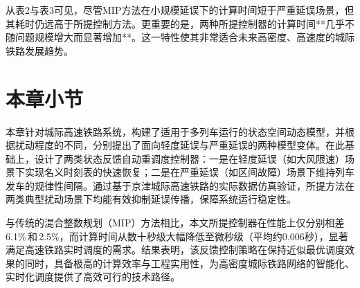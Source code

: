 从表2与表3可见，尽管MIP方法在小规模延误下的计算时间短于严重延误场景，但其耗时仍远高于所提控制方法。更重要的是，两种所提控制器的计算时间**几乎不随问题规模增大而显著增加**。这一特性使其非常适合未来高密度、高速度的城际铁路发展趋势。

\section{本章小节}
本章针对城际高速铁路系统，构建了适用于多列车运行的状态空间动态模型，并根据扰动程度的不同，分别提出了面向轻度延误与严重延误的两种模型变体。在此基础上，设计了两类状态反馈自动重调度控制器：一是在轻度延误（如大风限速）场景下实现名义时刻表的快速恢复；二是在严重延误（如区间故障）场景下维持列车发车的规律性间隔。通过基于京津城际高速铁路的实际数据仿真验证，所提方法在两类典型扰动场景下均能有效抑制延误传播，保障系统运行稳定性。

与传统的混合整数规划（MIP）方法相比，本文所提控制器在性能上仅分别相差6.1\%\,和\,2.5\%，而计算时间从数十秒级大幅降低至微秒级（平均约0.006秒），显著满足高速铁路实时调度的需求。结果表明，该反馈控制策略在保持近似最优调度效果的同时，具备极高的计算效率与工程实用性，为高密度城际铁路网络的智能化、实时化调度提供了高效可行的技术路径。

